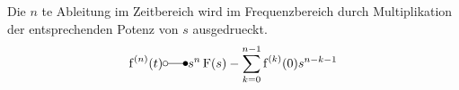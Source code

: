Die $n$ te Ableitung im Zeitbereich wird im Frequenzbereich durch Multiplikation der entsprechenden Potenz von $s$ ausgedrueckt.
$$\operatorname{f}^{(n)}(t) \laplace s^n \operatorname{F}(s) - \sum\limits_{k=0}^{n -1}\operatorname{f}^{(k)}(0) s^{n - k - 1}$$
